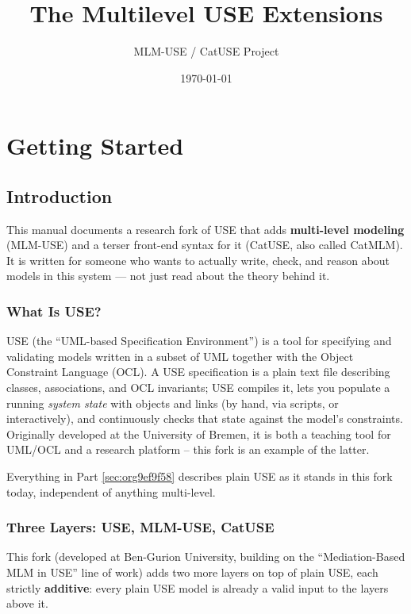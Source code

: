 \documentclass[11pt,twoside,a4paper]{book}
\author{MLM-USE / CatUSE Project}
\date{\today}
\title{The Multilevel USE Extensions}
\begin{document}
\maketitle
\tableofcontents

\frontmatter
\mainmatter

\part{Getting Started}
\label{sec:org8779709}
\chapter{Introduction}
\label{sec:orgc29df65}
This manual documents a research fork of USE that adds \textbf{multi-level
modeling} (MLM-USE) and a terser front-end syntax for it (CatUSE, also
called CatMLM). It is written for someone who wants to actually write,
check, and reason about models in this system --- not just read about
the theory behind it.

\section{What Is USE?}
\label{sec:orgb19dbad}

USE (the ``UML-based Specification Environment'') is a tool for
specifying and validating models written in a subset of UML together
with the Object Constraint Language (OCL). A USE specification is a
plain text file describing classes, associations, and OCL invariants;
USE compiles it, lets you populate a running \emph{system state} with
objects and links (by hand, via scripts, or interactively), and
continuously checks that state against the model's constraints.
Originally developed at the University of Bremen, it is both a
teaching tool for UML/OCL and a research platform -- this fork is an
example of the latter.

Everything in Part \ref{sec:org9ef9f58} describes plain USE as it stands
in this fork today, independent of anything multi-level.

\section{Three Layers: USE, MLM-USE, CatUSE}
\label{sec:orgd5a3a70}

This fork (developed at Ben-Gurion University, building on the
``Mediation-Based MLM in USE'' line of work) adds two more layers on top
of plain USE, each strictly \textbf{additive}: every plain USE model is
already a valid input to the layers above it.
\end{document}
